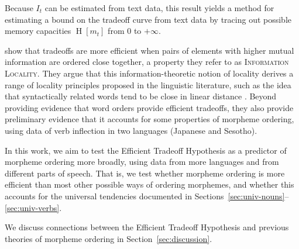 \documentclass[man]{apa7}
\newcommand{\citep}{\parencite}
\newcommand{\citet}{\Textcite}
\begin{document}
Because $I_t$ can be estimated from text data, this result yields a method for estimating a bound on the tradeoff curve from text data by tracing out possible memory capacities $\operatorname{H}[m_t]$ from $0$ to $+\infty$.


\citet{Hahn2020modeling} show that tradeoffs are more efficient when pairs of elements with higher mutual information are ordered close together, a property they refer to as \textsc{Information Locality}.
They argue that this information-theoretic notion of locality derives a range of locality principles proposed in the linguistic literature, such as the idea that syntactically related words tend to be close in linear distance \citep{rijkhoff-word-1986, hawkins-performance-1994, futrell-large-scale-2015, liu-dependency-2017, temperley-minimizing-2018, liu2008dependency, Cancho2004EuclideanDB}.
Beyond providing evidence that word orders provide efficient tradeoffs, they also provide preliminary evidence that it accounts for some properties of morpheme ordering, using data of verb inflection in two languages (Japanese and Sesotho).

In this work, we aim to test the Efficient Tradeoff Hypothesis as a predictor of morpheme ordering more broadly, using data from more languages and from different parts of speech.
That is, we test whether morpheme ordering is more efficient than most other possible ways of ordering morphemes, and whether this accounts for the universal tendencies documented in Sections~\ref{sec:univ-nouns}--\ref{sec:univ-verbs}.

We discuss connections between the Efficient Tradeoff Hypothesis and previous theories of morpheme ordering in Section~\ref{sec:discussion}.


\end{document}
